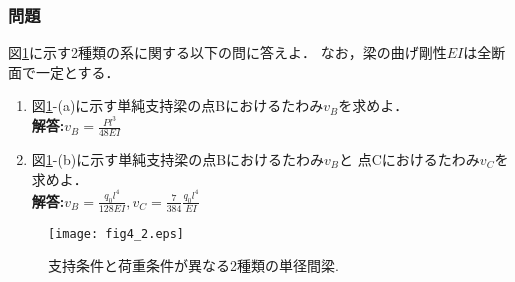 \documentclass[10pt,a4j]{jarticle}
\begin{document}
\subsubsection{問題}
図\ref{fig:fig2_4}に示す2種類の系に関する以下の問に答えよ．
なお，梁の曲げ剛性$EI$は全断面で一定とする．
\begin{enumerate}
\item
	図\ref{fig:fig2_4}-(a)に示す単純支持梁の点Bにおけるたわみ$v_B$を求めよ．\\
	{\bf 解答:}$v_B=\frac{Pl^3}{48EI}$
\item
	図\ref{fig:fig2_4}-(b)に示す単純支持梁の点Bにおけるたわみ$v_B$と
	点Cにおけるたわみ$v_C$を求めよ．\\
	{\bf 解答:}$v_B=\frac{q_0l^4}{128EI}, v_C=\frac{7}{384}\frac{q_0l^4}{EI}$
\end{enumerate}
\begin{figure}[h]
	\begin{center}
	\texttt{[image: fig4\_2.eps]} 
	\end{center}
	\caption{支持条件と荷重条件が異なる2種類の単径間梁.} 
	\label{fig:fig2_4}
\end{figure}
\end{document}
